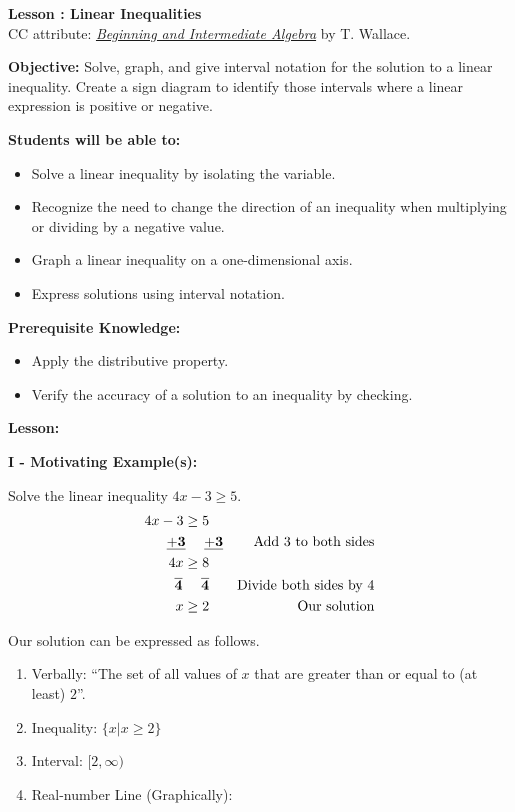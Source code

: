 \documentclass[12pt]{article}
\theoremstyle{definition}
\begin{document}
{\bf \large Lesson : Linear Inequalities}\\
CC attribute: \href{http://www.wallace.ccfaculty.org/book/book.html}{\it{Beginning and Intermediate Algebra}} by T. Wallace. \hfill \doclicenseImage[imagewidth=5em]\\
\par
{\bf Objective:} Solve, graph, and give interval notation for the solution to a linear inequality.  Create a sign diagram to identify those intervals where a linear expression is positive or negative.\\
\par
{\bf Students will be able to:}
\begin{itemize}
	\item Solve a linear inequality by isolating the variable.
	\item Recognize the need to change the direction of an inequality when multiplying or dividing by a negative value.
	\item Graph a linear inequality on a one-dimensional axis.
	\item Express solutions using interval notation.
\end{itemize}
{\bf Prerequisite Knowledge:}
\begin{itemize}
	\item Apply the distributive property.
	\item Verify the accuracy of a solution to an inequality by checking.
\end{itemize}
\hrulefill

{\bf Lesson:}
\par
{\bf I - Motivating Example(s):}\\
\par
Solve the linear inequality  $4x-3\geq 5$. 
\begin{eqnarray*}
4x-3\geq 5~~~&&\\
{\bf\underline{+3}~~~~\underline{+3}} &&  \text{Add~} 3 \text{~to~both~sides} \\
4x\geq 8~~~ && \\
{\bf\overline{4}~~~~\overline{4}}~~~&& \text{Divide~both~sides~by~} 4\\
x\geq 2~~~ && \text{Our~solution}
\end{eqnarray*}

Our solution can be expressed as follows.

\begin{enumerate}
	\item Verbally: ``The set of all values of $x$ that are greater than or equal to (at least) $2$''.
	\item Inequality: $\{x|x\geq 2\}$
	\item Interval: $[2,\infty)$
	\item Real-number Line (Graphically): 
\end{enumerate}
\end{document}
